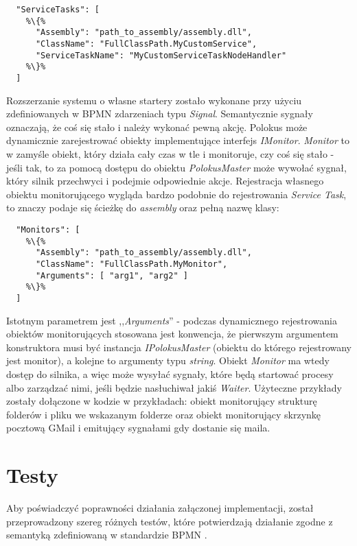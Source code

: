 \documentclass[declaration,shortabstract,mgr]{iithesis}
\newcommand{\bpmn}{BPMN }
\begin{document}
\begin{minipage}[c]{\textwidth}
\centering
\begin{lstlisting}
  "ServiceTasks": [
    %\{%
      "Assembly": "path_to_assembly/assembly.dll",
      "ClassName": "FullClassPath.MyCustomService",
      "ServiceTaskName": "MyCustomServiceTaskNodeHandler"
    %\}%
  ]
\end{lstlisting}
\end{minipage}

Rozszerzanie systemu o własne startery zostało wykonane przy użyciu zdefiniowanych w \bpmn zdarzeniach typu \textit{Signal}. Semantycznie sygnały oznaczają, że coś się stało i należy wykonać pewną akcję. Polokus może dynamicznie zarejestrować obiekty implementujące interfejs \textit{IMonitor}. \textit{Monitor} to w zamyśle obiekt, który działa cały czas w tle i monitoruje, czy coś się stało - jeśli tak, to za pomocą dostępu do obiektu \textit{PolokusMaster} może wywołać sygnał, który silnik przechwyci i podejmie odpowiednie akcje. Rejestracja własnego obiektu monitorującego wygląda bardzo podobnie do rejestrowania \textit{Service Task}, to znaczy podaje się ścieżkę do \textit{assembly} oraz pełną nazwę klasy:

\begin{minipage}[c]{\textwidth}
\centering
\begin{lstlisting}
  "Monitors": [
    %\{%
      "Assembly": "path_to_assembly/assembly.dll",
      "ClassName": "FullClassPath.MyMonitor",
      "Arguments": [ "arg1", "arg2" ]
    %\}%
  ]
\end{lstlisting}
\end{minipage}

 Istotnym parametrem jest ,,\textit{Arguments}'' - podczas dynamicznego rejestrowania obiektów monitorujących stosowana jest konwencja, że pierwszym argumentem konstruktora musi być instancja \textit{IPolokusMaster} (obiektu do którego rejestrowany jest monitor), a kolejne to argumenty typu \textit{string}. Obiekt \textit{Monitor} ma wtedy dostęp do silnika, a więc może wysyłać sygnały, które będą startować procesy albo zarządzać nimi, jeśli będzie nasłuchiwał jakiś \textit{Waiter}. Użyteczne przykłady zostały dołączone w kodzie w przykładach: obiekt monitorujący strukturę folderów i pliku we wskazanym folderze oraz obiekt monitorujący skrzynkę pocztową GMail i emitujący sygnałami gdy dostanie się maila.

\chapter{Testy}\label{chapter-tests}
Aby poświadczyć poprawności działania załączonej implementacji, został przeprowadzony szereg różnych testów, które potwierdzają działanie zgodne z semantyką zdefiniowaną w standardzie \bpmn.
\end{document}
